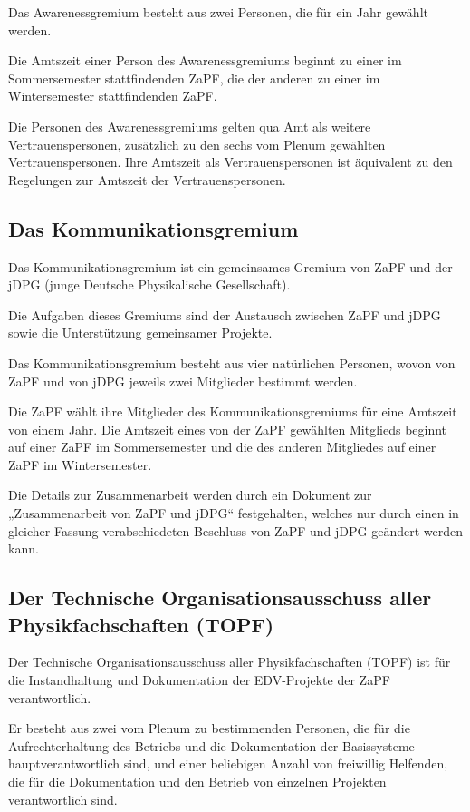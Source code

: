 \documentclass[
  a4paper,
  oneside]{scrartcl}
\begin{document}
Das Awarenessgremium besteht aus zwei Personen, die für ein Jahr gewählt
werden.

Die Amtszeit einer Person des Awarenessgremiums beginnt zu einer im
Sommersemester stattfindenden ZaPF, die der anderen zu einer im
Wintersemester stattfindenden ZaPF.

Die Personen des Awarenessgremiums gelten qua Amt als weitere
Vertrauenspersonen, zusätzlich zu den sechs vom Plenum gewählten
Vertrauenspersonen. Ihre Amtszeit als Vertrauenspersonen ist äquivalent
zu den Regelungen zur Amtszeit der Vertrauenspersonen.

\subsection{Das Kommunikationsgremium}\label{das-kommunikationsgremium}

Das Kommunikationsgremium ist ein gemeinsames Gremium von ZaPF und der
jDPG (junge Deutsche Physikalische Gesellschaft).

Die Aufgaben dieses Gremiums sind der Austausch zwischen ZaPF und jDPG
sowie die Unterstützung gemeinsamer Projekte.

Das Kommunikationsgremium besteht aus vier natürlichen Personen, wovon
von ZaPF und von jDPG jeweils zwei Mitglieder bestimmt werden.

Die ZaPF wählt ihre Mitglieder des Kommunikationsgremiums für eine
Amtszeit von einem Jahr. Die Amtszeit eines von der ZaPF gewählten
Mitglieds beginnt auf einer ZaPF im Sommersemester und die des anderen
Mitgliedes auf einer ZaPF im Wintersemester.

Die Details zur Zusammenarbeit werden durch ein Dokument zur
„Zusammenarbeit von ZaPF und jDPG`` festgehalten, welches nur durch
einen in gleicher Fassung verabschiedeten Beschluss von ZaPF und jDPG
geändert werden kann.

\subsection{Der Technische Organisationsausschuss aller
Physikfachschaften
(TOPF)}\label{der-technische-organisationsausschuss-aller-physikfachschaften-topf}

Der Technische Organisationsausschuss aller Physikfachschaften (TOPF)
ist für die Instandhaltung und Dokumentation der EDV-Projekte der ZaPF
verantwortlich.

Er besteht aus zwei vom Plenum zu bestimmenden Personen, die für die
Aufrechterhaltung des Betriebs und die Dokumentation der Basissysteme
hauptverantwortlich sind, und einer beliebigen Anzahl von freiwillig
Helfenden, die für die Dokumentation und den Betrieb von einzelnen
Projekten verantwortlich sind.
\end{document}
